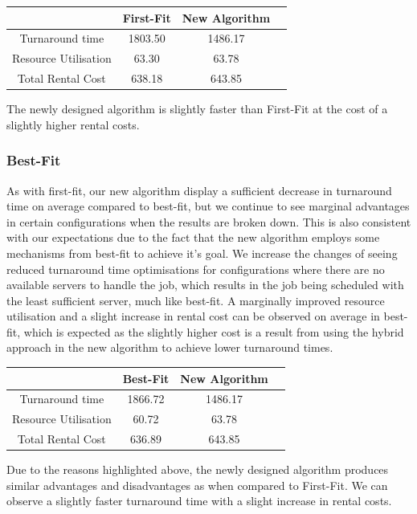 \documentclass[a4paper]{article}
\begin{document}
\begin{center}
\begin{tabular}{|c|c|c|c|} 
 \hline
   & First-Fit & New Algorithm \\ [0.5ex] 
 \hline
 Turnaround time & 1803.50 & 1486.17 \\ 
 \hline
 Resource Utilisation & 63.30 & 63.78 \\
 \hline
 Total Rental Cost & 638.18 & 643.85 \\
 \hline
\end{tabular}
\end{center}

The newly designed algorithm is slightly faster than First-Fit at the cost of a slightly higher rental costs.

\subsubsection*{Best-Fit}
As with first-fit, our new algorithm display a sufficient decrease in turnaround time on average compared to best-fit, but we continue to see marginal advantages in certain configurations when the results are broken down. This is also consistent with our expectations due to the fact that the new algorithm employs some mechanisms from best-fit to achieve it's goal. We increase the changes of seeing reduced turnaround time optimisations for configurations where there are no available servers to handle the job, which results in the job being scheduled with the least sufficient server, much like best-fit. A marginally improved resource utilisation and a slight increase in rental cost can be observed on average in best-fit, which is expected as the slightly higher cost is a result from using the hybrid approach in the new algorithm to achieve lower turnaround times.

\begin{center}
\begin{tabular}{|c|c|c|c|} 
 \hline
   & Best-Fit & New Algorithm \\ [0.5ex] 
 \hline
 Turnaround time & 1866.72 & 1486.17 \\ 
 \hline
 Resource Utilisation & 60.72 & 63.78 \\
 \hline
 Total Rental Cost & 636.89 & 643.85 \\
 \hline
\end{tabular}
\end{center}

Due to the reasons highlighted above, the newly designed algorithm produces similar advantages and disadvantages as when compared to First-Fit. We can observe a slightly faster turnaround time with a slight increase in rental costs.
\end{document}
